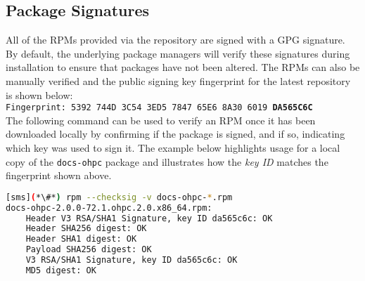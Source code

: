 \clearpage
\subsection{Package Signatures}

All of the RPMs provided via the \OHPC{} repository are signed with a GPG
signature. By default, the underlying package managers will verify these signatures during
installation to ensure that packages have not been altered. The RPMs can also
be manually verified and the public signing key fingerprint for the latest
repository is shown below: \\

\texttt{Fingerprint: 5392 744D 3C54 3ED5 7847  65E6 8A30 6019 {\bf DA565C6C}} \\

\noindent The following command can be used to verify an RPM once it
has been downloaded locally by confirming if the package is signed, and if so,
indicating which key was used to sign it. The example below highlights usage
for a local copy of the \texttt{docs-ohpc} package and illustrates how the {\em
key ID} matches the fingerprint shown above.

\begin{lstlisting}[language=bash,keywords={}]
[sms](*\#*) rpm --checksig -v docs-ohpc-*.rpm
docs-ohpc-2.0.0-72.1.ohpc.2.0.x86_64.rpm:
    Header V3 RSA/SHA1 Signature, key ID da565c6c: OK
    Header SHA256 digest: OK
    Header SHA1 digest: OK
    Payload SHA256 digest: OK
    V3 RSA/SHA1 Signature, key ID da565c6c: OK
    MD5 digest: OK

\end{lstlisting}



